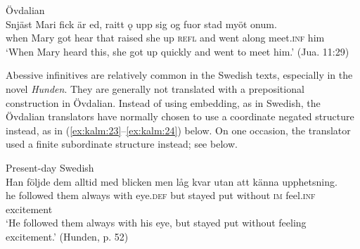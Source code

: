 \documentclass[output=paper]{langscibook}
\begin{document}
\ex Övdalian\label{ex:kalm:22b}\\ 
\gll Snjäst Mari fick är ed, raitt ǫ upp sig og fuor stad myöt onum.\\
when Mary got hear that raised she up \textsc{refl} and went along meet.\textsc{inf} him\\
\glt ‘When Mary heard this, she got up quickly and went to meet him.’ (Jua. 11:29)
\z 
\z 


Abessive infinitives are relatively common in the Swedish texts, especially in the novel \textit{Hunden}. They are generally not translated with a prepositional construction in Övdalian. Instead of using embedding, as in Swedish, the Övdalian translators have normally chosen to use a coordinate negated structure instead, as in (\ref{ex:kalm:23}--\ref{ex:kalm:24}) below. On one occasion, the translator used a finite subordinate structure instead; see  below.\largerpage[-1]


\ea
\label{ex:kalm:23}
\ea Present-day Swedish\label{ex:kalm:23a}\\
\gll Han följde dem alltid med blicken men låg kvar utan att känna upphetsning.\\
he followed them always with eye.\textsc{def} but stayed put without \textsc{im} feel.\textsc{inf} excitement\\
\glt ‘He followed them always with his eye, but stayed put without feeling excitement.’ (Hunden, p. 52)\\
\end{document}
